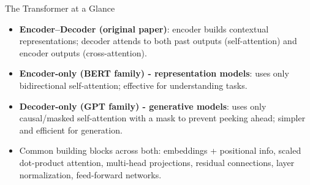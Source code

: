 \documentclass[aspectratio=169]{beamer}
\begin{document}
\begin{frame}{The Transformer at a Glance}
  \begin{itemize}
    \item \textbf{Encoder--Decoder (original paper)}: encoder builds contextual representations; decoder attends to both past outputs (self-attention) and encoder outputs (cross-attention).
    \item \textbf{Encoder-only (BERT family) - representation models}: uses only bidirectional self-attention; effective for understanding tasks.
    \item \textbf{Decoder-only (GPT family) - generative models}: uses only causal/masked self-attention with a mask to prevent peeking ahead; simpler and efficient for generation.
    \item Common building blocks across both: embeddings + positional info, scaled dot-product attention, multi-head projections, residual connections, layer normalization, feed-forward networks.
  \end{itemize}
\end{frame}
\end{document}
